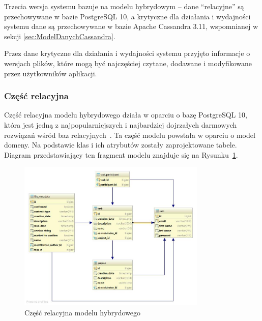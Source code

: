 Trzecia wersja systemu bazuje na modelu hybrydowym -- dane \enquote{relacyjne} są przechowywane w bazie PostgreSQL 10, a krytyczne dla działania i wydajności systemu dane są przechowywane w bazie Apache Cassandra 3.11, wspomnianej w sekcji \ref{sec:ModelDanychCassandra}.

Przez dane krytyczne dla działania i wydajności systemu przyjęto informacje o wersjach plików, które mogą być najczęściej czytane, dodawane i modyfikowane przez użytkowników aplikacji.

\subsubsection{Część relacyjna}

Część relacyjna modelu hybrydowego działa w oparciu o bazę PostgreSQL 10, która jest jedną z najpopularniejszych i najbardziej dojrzałych darmowych rozwiązań wśród baz relacyjnych~\cite{DBEnginesRankingRDBMS}.
Ta część modelu powstała w oparciu o model domeny.
Na podstawie klas i ich atrybutów zostały zaprojektowane tabele.
Diagram przedstawiający ten fragment modelu znajduje się na Rysunku~\ref{fig:postgreModelDiag}.

\begin{figure}[!ht]
\centering
\includegraphics[width=0.8\textwidth]{figures/diagram.jpg}
\caption{Część relacyjna modelu hybrydowego}
\label{fig:postgreModelDiag}
\end{figure}


